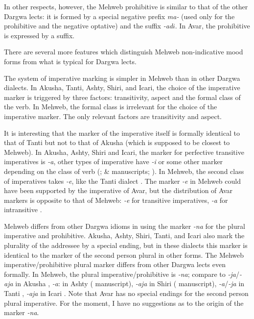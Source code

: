 ﻿\documentclass[output=paper]{langsci/langscibook}
\begin{document}
In other respects, however, the Mehweb prohibitive is similar to that of
the other Dargwa lects: it is formed by a special negative prefix
\emph{ma-} (used only for the prohibitive and the negative optative) and
the suffix \emph{-ad\(i\)}. In Avar, the prohibitive is expressed
by a suffix.

There are several more features which distinguish Mehweb non-indicative
mood forms from what is typical for Dargwa lects.

The system of imperative marking is simpler in Mehweb than in other
Dargwa dialects. In Akusha, Tanti, Ashty, Shiri, and Icari, the choice
of the imperative marker is triggered by three factors: transitivity,
aspect and the formal class of the verb. In Mehweb, the formal class is
irrelevant for the choice of the imperative marker. The only relevant
factors are transitivity and aspect.

It is interesting that the marker of the imperative itself is formally
identical to that of Tanti but not to that of Akusha (which is supposed
to be closest to Mehweb). In Akusha, Ashty, Shiri and Icari, the marker
for perfective transitive imperatives is \emph{-a}, other types of
imperative have \emph{-i} or some other marker depending on the class
of verb (\citealt[48]{vandenberg2001}; \citealt{belyaev:ocherk} \& \citeyear{belyaev:shiri} manuscripts; \citealt{mutalov-sumbatova2003}). In Mehweb, the second class of imperatives takes \emph{-e}, like
the Tanti dialect \citep[142]{sumbatova-lander2014}. The marker \emph{-e}
in Mehweb could have been supported by the imperative of Avar, but the
distribution of Avar markers is opposite to that of Mehweb: \emph{-e}
for transitive imperatives, \emph{-a} for intransitive \citep[105]{charachidze1981}.

Mehweb differs from other Dargwa idioms in using the marker \emph{-na}
for the plural imperative and prohibitive. Akusha, Ashty, Shiri, Tanti,
and Icari also mark the plurality of the addressee by a special ending,
but in these dialects this marker is identical to the marker of the
second person plural in other forms. The Mehweb imperative/prohibitive
plural marker differs from other Dargwa lects even formally. In Mehweb,
the plural imperative/prohibitive is \emph{-na}; compare to \mbox{\emph{-ja}}/\mbox{\emph{-aja}} in Akusha \citep[48]{vandenberg2001}, \emph{-a}: in Ashty (\citealt{belyaev:ocherk}
manuscript), \mbox{\emph{-aja}} in Shiri (\citealt{belyaev:shiri} manuscript), \mbox{\emph{-a}}/\mbox{\emph{-ja}}
in Tanti \citep[142]{sumbatova-lander2014}, \emph{-aja} in Icari \citep{mutalov-sumbatova2003}.
Note that Avar has no special endings for the second person
plural imperative. For the moment, I have no suggestions as to the
origin of the marker \emph{-na}.
\end{document}
